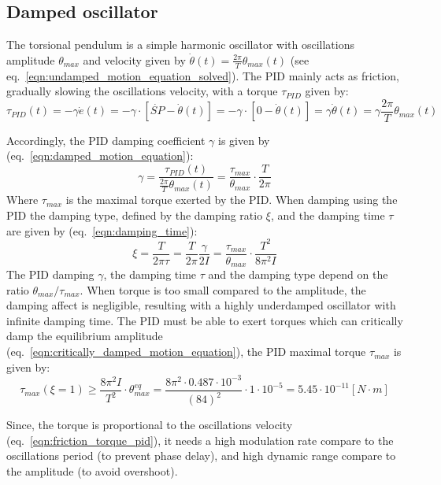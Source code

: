 \documentclass[\main/master.tex]{subfiles}
\begin{document}
\subsection{Damped oscillator}
The torsional pendulum is a simple harmonic oscillator with oscillations amplitude $\theta_{max}$ and velocity given by $\dot{\theta}(t) =\frac{2\pi}{T} \theta_{max}( t)$ (see eq.~\ref{eqn:undamped_motion_equation_solved}). The PID mainly acts as friction, gradually slowing the oscillations velocity, with a torque $\tau_{PID}$ given by:
\begin{equation}
\tau_{PID}(t) = -\gamma\dot{e}(t) =  -\gamma\cdot [\dot{SP} -\dot{\theta}(t)] =-\gamma\cdot [0-\dot{\theta}(t)]  =  \gamma\dot{\theta}(t) =  \gamma\frac{2\pi}{T} \theta_{max}( t) 
\label{eqn:friction_torque_pid}
\end{equation}
\par\noindent
Accordingly, the PID damping coefficient $\gamma$ is given by (eq.~\ref{eqn:damped_motion_equation}):
\begin{equation}
\gamma  =  \frac{\tau_{PID}(t)}{\frac{2\pi}{T} \theta_{max}( t) } =\frac{\tau_{max}}{\theta_{max}}\cdot \frac{ T}{2\pi}          \label{eqn:pid damping coefficient}
\end{equation}
Where $\tau_{max}$ is the maximal torque exerted by the PID. When damping using the PID the damping type, defined by the damping ratio $\xi$, and the damping time $\tau$ are given by (eq.~\ref{eqn:damping_time}):
\begin{equation}
\xi = \frac{T}{2 \pi \tau } =  \frac{T}{2 \pi  }\frac{\gamma}{2I}  = \frac{ \tau_{max}}{\theta_{max}} \cdot \frac{T^2}{8\pi^2 I}  \label{eqn:damping_time_pid}
\end{equation}
The PID damping $\gamma$, the damping time $\tau$ and the damping type depend on the ratio $\theta_{max}/\tau_{max}$. When torque is too small compared to the amplitude, the damping affect is negligible, resulting with a highly underdamped oscillator with infinite damping time. The PID must be able to exert torques which can critically damp the equilibrium amplitude (eq.~\ref{eqn:critically_damped_motion_equation}), the PID maximal torque $\tau_{max} $ is given by:
\begin{equation}
\tau_{max} (\xi = 1)\geq\frac{ 8 \pi^2 I }{T^2}\cdot\theta_{max}^{eq} = \frac{  8 \pi^2 \cdot 0.487\cdot10^{-3} }{(84)^2}\cdot 1\cdot10^{-5} = 5.45\cdot10^{-11}[N\cdot m]
\label{eqn:damping_torque_pid}
\end{equation}
\par\noindent
Since, the torque is proportional to the oscillations velocity (eq.~\ref{eqn:friction_torque_pid}), it needs a high modulation rate compare to the oscillations period (to prevent phase delay), and high dynamic range compare to the amplitude (to avoid overshoot). 
\end{document}
